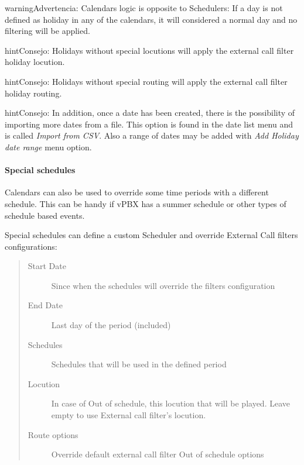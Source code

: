 \documentclass[letterpaper,10pt,spanish]{sphinxmanual}
\begin{document}
\begin{notice}{warning}{Advertencia:}
Calendars logic is opposite to Schedulers: If a day is not defined
as holiday in any of the calendars, it will considered a normal day and no
filtering will be applied.
\end{notice}

\begin{notice}{hint}{Consejo:}
Holidays without special locutions will apply the external call filter
holiday locution.
\end{notice}

\begin{notice}{hint}{Consejo:}
Holidays without special routing will apply the external call filter
holiday routing.
\end{notice}

\begin{notice}{hint}{Consejo:}
In addition, once a date has been created, there is the possibility of
importing more dates from a file. This option is found in the date list menu and
is called \emph{Import from CSV}.
Also a range of dates may be added with \emph{Add Holiday date range} menu option.
\end{notice}


\paragraph{Special schedules}
\label{administration_portal/client/vpbx/routing_tools/calendars:id2}\label{administration_portal/client/vpbx/routing_tools/calendars:special-schedules}
Calendars can also be used to override some time periods with a different schedule.
This can be handy if vPBX has a summer schedule or other types of schedule based events.

Special schedules can define a custom Scheduler and override External Call filters configurations:
\begin{quote}
\begin{description}
\item[{Start Date}] \leavevmode
Since when the schedules will override the filters configuration

\item[{End Date}] \leavevmode
Last day of the period (included)

\item[{Schedules}] \leavevmode
Schedules that will be used in the defined period

\item[{Locution}] \leavevmode
In case of Out of schedule, this locution that will be played. Leave empty to use External
call filter's locution.

\item[{Route options}] \leavevmode
Override default external call filter Out of schedule options

\end{description}
\end{quote}
\end{document}
